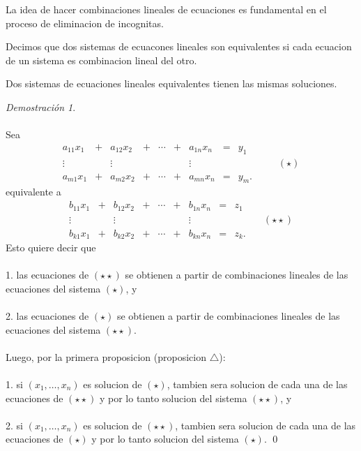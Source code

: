 \documentclass{article}
\theoremstyle{definition}
\theoremstyle{definition}
\theoremstyle{remark}
\newtheorem*{demo}{Demostración}
\begin{document}
La idea de hacer combinaciones lineales de ecuaciones es fundamental en el proceso de eliminacion de incognitas.
\begin{defi}
  Decimos que dos sistemas de ecuacones lineales son equivalentes si cada ecuacion de un sistema es combinacion lineal del otro.
\end{defi}\begin{teo}
  Dos sistemas de ecuaciones lineales equivalentes tienen las mismas soluciones.
\end{teo}
\begin{demo}\;\\\\
  Sea \[
    \begin{matrix}
      a_{11}x_{1} & + & a_{12}x_{2}& + & \cdots & + & a_{1n}x_{n} & = & y_1 \\
    \vdots & & \vdots && &&\vdots && & \phantom{\star} \quad(\star) \\
      a_{m1}x_{1} & + & a_{m2}x_{2} & + & \cdots & + & a_{mn}x_{n} & = & y_{m}.
    \end{matrix}
  \]
  equivalente a \[
\begin{matrix}
      b_{11}x_{1} & + & b_{12}x_{2}& + & \cdots & + & b_{1n}x_{n} & = & z_1 \\
      \vdots & & \vdots && &&\vdots && &\quad (\star \star) \\
      b_{k1}x_{1} & + & b_{k2}x_{2} & + & \cdots & + & b_{kn}x_{n} & = & z_{k}.
    \end{matrix}
  \]
  Esto quiere decir que \\\\
  \textcolor{azulp2}{1.} las ecuaciones de $(\star\star)$ se obtienen a partir de combinaciones lineales de las ecuaciones del sistema $(\star)$, y \\\\
  \textcolor{azulp2}{2.} las ecuaciones de $(\star)$ se obtienen a partir de combinaciones lineales de las ecuaciones del sistema $(\star\star)$.\\\\
  Luego, por la primera proposicion (proposicion $\triangle$): \\\\
  \textcolor{azulp2}{1.} si $(x_1,\dots,x_n)$ es solucion de $(\star)$, tambien sera solucion de cada una de las ecuaciones de $(\star\star)$ y por lo tanto solucion del sistema $(\star\star)$, y \\\\
  \textcolor{azulp2}{2.} si $(x_1,\dots,x_n)$ es solucion de $(\star\star)$, tambien sera solucion de cada una de las ecuaciones de $(\star)$ y por lo tanto solucion del sistema $(\star)$.
  \qed
\end{demo}
\end{document}
